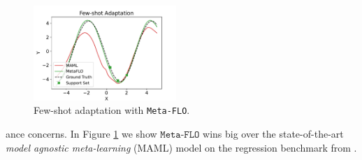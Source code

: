 \documentclass{article}
\theoremstyle{plain}
\theoremstyle{definition}
\theoremstyle{remark}
\newcommand{\infonce}{\texttt{InfoNCE}}
\newcommand{\FLO}{\texttt{FLO}}
\newcommand{\FDV}{\texttt{FDV}}
\begin{document}
\begin{figure}[H]
{\begin{minipage}{.6\textwidth}
\begin{center}
						\includegraphics[width=0.48\textwidth,trim={.48in 0 .5in 0},clip]{figures/meta/sin_no_noise_adaptation_2}
					\end{center}
					\vspace{-1.2em}
					\caption{Few-shot adaptation with \texttt{Meta-FLO}. \label{fig:meta}}
				\end{minipage}
			}
			\vspace{-1.7em}
		\end{figure}
		ance concerns. In Figure \ref{fig:meta} we show $\texttt{Meta-FLO}$ wins big over the state-of-the-art {\it model agnostic meta-learning} (MAML) model on the regression benchmark from \citep{finn2017model}. 
		
		
		
		
		
		
		
\end{document}
